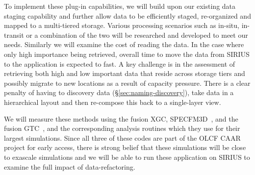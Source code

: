 To implement these plug-in capabilities, we will build upon our existing data staging 
capability and further allow data to be
efficiently staged, re-organized and mapped to a multi-tiered storage. Various
processing scenarios such as in-situ, in-transit or a combination of the two
will be researched and developed to meet our needs.
Similarly we will examine the cost of reading the data. In the case where only high importance being retrieved,
overall time to move the data from SIRIUS to the
application is expected to fast. A key challenge is in the assessment of retrieving
both high and low important data that reside across storage tiers and possibly migrate to
new locations as a result of capacity pressure. There is a
clear penalty of having to discovery data (\S\ref{sec:naming-discovery}), take data in a hierarchical layout and then re-compose
this back to a single-layer view.  

We will measure these methods using the fusion XGC, SPECFM3D~\cite{SPECFEM3D}, and the
fusion GTC~\cite{klasky2003grid}, and the
corresponding analysis routines which they use for their largest simulations.
Since all three of these codes are part of the
OLCF CAAR~\cite{CAAR} project for early access, there is strong belief that these
simulations will be close to exascale simulations and we will be able to run
these application on SIRIUS to examine the full impact of data-refactoring.

